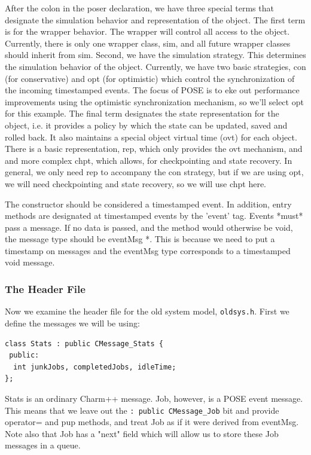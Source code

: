\documentclass[10pt]{article}
\begin{document}
After the colon in the poser declaration, we have three special terms that
designate the simulation behavior and representation of the object.  The first
term is for the wrapper behavior.  The wrapper will control all access to the
object.  Currently, there is only one wrapper class, sim, and all future
wrapper classes should inherit from sim.  Second, we have the simulation
strategy.  This determines the simulation behavior of the object.  Currently,
we have two basic strategies, con (for conservative) and opt (for optimistic)
which control the synchronization of the incoming timestamped events.  The
focus of POSE is to eke out performance improvements using the optimistic
synchronization mechanism, so we'll select opt for this example.  The final
term designates the state representation for the object, i.e. it provides a
policy by which the state can be updated, saved and rolled back.  It also
maintains a special object virtual time (ovt) for each object.  There is a
basic representation, rep, which only provides the ovt mechanism, and and more
complex chpt, which allows, for checkpointing and state recovery.  In general,
we only need rep to accompany the con strategy, but if we are using opt, we
will need checkpointing and state recovery, so we will use chpt here. 

The constructor should be considered a timestamped event.  In addition, entry
methods are designated at timestamped events by the 'event' tag.  Events
*must* pass a message.  If no data is passed, and the method would otherwise
be void, the message type should be eventMsg *.  This is because we need to
put a timestamp on messages and the eventMsg type corresponds to a timestamped
void message. 

\subsubsection{The Header File}

Now we examine the header file for the old system model,
{\tt oldsys.h}.  First we define the messages we will be using:

\begin{verbatim}
class Stats : public CMessage_Stats {
 public:
  int junkJobs, completedJobs, idleTime;
};
\end{verbatim}

Stats is an ordinary Charm++ message.  Job, however, is a POSE event message.
This means that we leave out the \verb|: public CMessage_Job| bit and provide
operator= and pup methods, and treat Job as if it were derived from eventMsg.
Note also that Job has a "next" field which will allow us to store these Job
messages in a queue.
\end{document}
